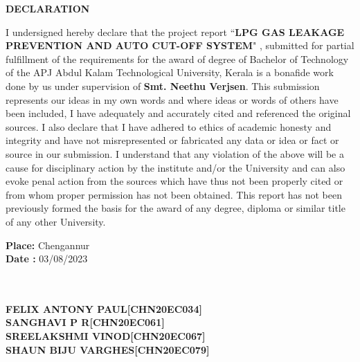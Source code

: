 \documentclass[a4paper,12pt]{report}
\begin{document}
\begin{center}
 \Large {\bf \uppercase{Declaration}}
\end{center}
\vspace{1cm}
\par
I undersigned hereby declare that the project report  “\textbf{LPG GAS LEAKAGE PREVENTION AND AUTO CUT-OFF SYSTEM}" , submitted for partial fulfillment of the requirements for the award of degree of Bachelor of Technology of the APJ Abdul Kalam Technological University, Kerala is a bonafide work done by us under supervision of \textbf{Smt. Neethu Verjsen}. This submission represents our ideas in my own words and where ideas or words of others have been included, I have adequately and accurately cited and referenced the original sources. I also declare that I have adhered to ethics of academic honesty and integrity and have not misrepresented or fabricated any data or idea or fact or source in our submission. I understand that any violation of the above will be a cause for disciplinary action by the institute and/or the University and can also evoke penal action from the sources which have thus not been properly cited or from whom proper permission has not been obtained. This report has not been previously formed the basis for the award of any degree, diploma or similar title of any other University. 

\noindent \begin{minipage}{0.45\linewidth}
\begin{flushleft}
\vspace{1cm}

\textbf {Place:} Chengannur \\
\textbf {Date :} 03/08/2023

\end{flushleft} 
\end{minipage}
\hfill
\begin{minipage}{0.50\linewidth}
\begin{flushright}                                      
\vspace{3cm}

\\
\\
\textbf{ FELIX ANTONY PAUL[CHN20EC034]\\ SANGHAVI P R[CHN20EC061]\\ SREELAKSHMI VINOD[CHN20EC067]\\ SHAUN BIJU VARGHES[CHN20EC079]\\}



\end{flushright} 
\end{minipage}
\clearpage
\end{document}
